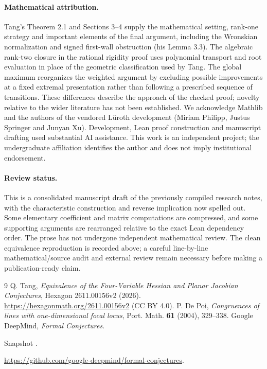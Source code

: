 \documentclass[11pt,a4paper]{article}
\begin{document}
\paragraph{Mathematical attribution.}
Tang's Theorem 2.1 and Sections 3--4 \cite{tang} supply the mathematical setting, rank-one strategy and important elements of the final argument, including the Wronskian normalization and signed first-wall obstruction (his Lemma 3.3). The algebraic rank-two closure in the rational rigidity proof uses polynomial transport and root evaluation in place of the geometric classification used by Tang. The global maximum reorganizes the weighted argument by excluding possible improvements at a fixed extremal presentation rather than following a prescribed sequence of transitions. These differences describe the approach of the checked proof; novelty relative to the wider literature has not been established. We acknowledge Mathlib and the authors of the vendored L\"uroth development (Miriam Philipp, Justus Springer and Junyan Xu). Development, Lean proof construction and manuscript drafting used substantial AI assistance. This work is an independent project; the undergraduate affiliation identifies the author and does not imply institutional endorsement.

\paragraph{Review status.}
This is a consolidated manuscript draft of the previously compiled research notes, with the characteristic construction and reverse implication now spelled out. Some elementary coefficient and matrix computations are compressed, and some supporting arguments are rearranged relative to the exact Lean dependency order. The prose has not undergone independent mathematical review. The clean equivalence reproduction is recorded above; a careful line-by-line mathematical/source audit and external review remain necessary before making a publication-ready claim.

\begin{thebibliography}{9}
 Q. Tang, \emph{Equivalence of the Four-Variable Hessian and Planar Jacobian Conjectures}, Hexagon 2611.00156v2 (2026). \url{https://hexagonmath.org/2611.00156v2} (CC BY 4.0).
 P. De Poi, \emph{Congruences of lines with one-dimensional focal locus}, Port. Math. \textbf{61} (2004), 329--338.
 Google DeepMind, \emph{Formal Conjectures}.\par
Snapshot .\par
\url{https://github.com/google-deepmind/formal-conjectures}.
\end{thebibliography}
\end{document}
